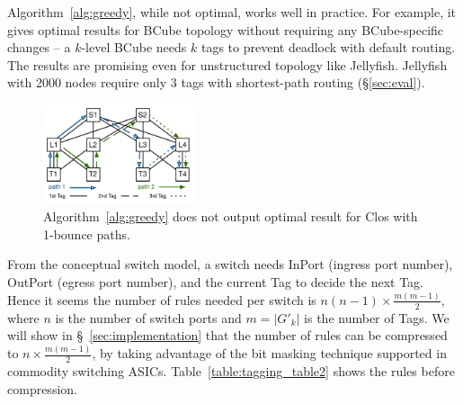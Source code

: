 


 Algorithm~\ref{alg:greedy}, while not optimal, works well
in practice. For example, it gives optimal results for BCube topology without
requiring any BCube-specific changes -- a $k$-level BCube needs $k$ tags to
prevent deadlock with default routing. The results are promising even for
unstructured topology like Jellyfish. Jellyfish with 2000 nodes require only 3
tags with shortest-path routing (\S\ref{sec:eval}).

\begin{figure}[t]
	\centering
	\includegraphics[width=0.4\textwidth] {figs/nonoptimal_example}
	\vspace{-0.15in}
	\caption{Algorithm~\ref{alg:greedy} does not output optimal result for Clos with 1-bounce paths.}
	\label{fig:nonoptimal}
	\vspace{-0.2in}
\end{figure}

 From the conceptual switch model, a switch needs InPort 
(ingress port number), OutPort (egress port number), and the current Tag to decide the next Tag.
Hence it seems the number of rules needed per switch is $n(n-1)\times
\frac{m(m-1)}{2}$, where $n$ is the number of switch ports and $m=|G'_{k}|$ is
the number of Tags. We will show in \S~\ref{sec:implementation} that the number
of rules can be compressed to  $n\times \frac{m(m-1)}{2}$, by taking advantage
of the bit masking technique supported in commodity switching ASICs.
Table~\ref{table:tagging_table2} shows the rules before compression.

